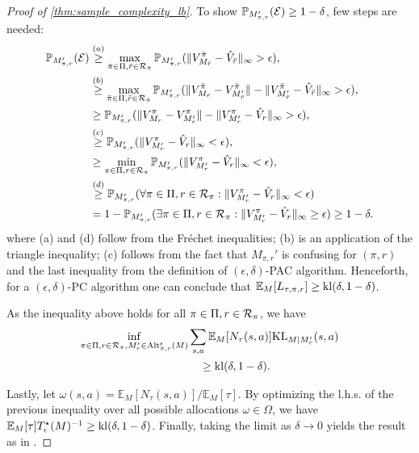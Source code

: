\begin{proof}[Proof of \cref{thm:sample_complexity_lb}]
 To show $\mathbb{P}_{M_{\pi,r}'}({\cal E})\geq 1-\delta$, few steps are needed:
 \begin{align*}
         \mathbb{P}_{M_{\pi,r}'}({\cal E}) & \stackrel{(a)}{\geq} \max_{\bar\pi\in \Pi,\bar r\in {\cal R}_{\bar\pi}} \mathbb{P}_{M_{\pi,r}'}(\|V_{M_{\bar r}}^{\bar\pi} - \hat V_{\bar r}\|_\infty > \epsilon),\\
         &\stackrel{(b)}{\geq} \max_{\bar\pi\in \Pi,\bar r\in {\cal R}_{\bar\pi}} \mathbb{P}_{M_{\pi,r}'}(\|V_{M_{\bar r}}^{\bar\pi} - V_{M_{\bar r}'}^{\bar\pi}\| -\|V_{M_{\bar r}'}^{\bar\pi}- \hat V_{\bar r}\|_\infty > \epsilon),\\
         &\geq 
         \mathbb{P}_{M_{\pi,r}'}(\|V_{M_{ r}}^\pi - V_{M_{ r}'}^\pi\| -\|V_{M_{ r}'}^\pi- \hat V_{ r}\|_\infty > \epsilon),\\
         &\stackrel{(c)}{\geq} \mathbb{P}_{M_{\pi,r}'}(\|V_{M_{ r}'}^\pi- \hat V_{ r}\|_\infty < \epsilon),\\
         &\geq \min_{\pi\in \Pi, r\in {\cal R}_\pi} \mathbb{P}_{M_{\pi,r}'}(\|V_{M_{ r}'}^\pi- \hat V_{ r}\|_\infty < \epsilon),\\
         &\stackrel{(d)}{\geq}  \mathbb{P}_{M_{\pi,r}'}(\forall \pi\in \Pi,r\in {\cal R}_\pi:\|V_{M_{ r}'}^\pi- \hat V_{ r}\|_\infty < \epsilon)\\&=1-  \mathbb{P}_{M_{\pi,r}'}(\exists \pi\in \Pi, r\in{\cal R}_\pi:\|V_{M_{ r}'}^\pi- \hat V_{ r}\|_\infty \geq  \epsilon)\geq 1-\delta.
     \end{align*}
 where (a) and (d) follow from the Fréchet inequalities; (b) is an application of  the triangle inequality; (c) follows from the fact that $M_{\pi,r}'$ is confusing for  $(\pi,r)$ and the last inequality from the definition of $(\epsilon,\delta)$-PAC algorithm.
 Henceforth,  for a  $(\epsilon,\delta)$-PC algorithm one can conclude that $\mathbb{E}_{M}[L_{\tau,\pi,r}] \geq  {\rm kl}(\delta,1-\delta)$.


As the inequality above holds for all $\pi\in \Pi, r\in {\cal R}_\pi$, we have
\begin{align*} \inf_{\pi\in \Pi, r\in {\cal R}_\pi,M_r'\in{\rm Alt}_{\pi,r}^\epsilon(M)}&\sum_{s,a}\mathbb{E}_{M}[N_\tau(s,a)]{\rm KL}_{M|M_r'}(s,a)\\
 &\quad\geq {\rm kl}(\delta,1-\delta).
\end{align*}

Lastly, let $\omega(s,a) = \mathbb{E}_M[N_\tau(s,a)]/\mathbb{E}_M[\tau]$.
By optimizing the l.h.s. of the previous inequality  over all possible allocations $\omega \in \Omega$, we have
$
    \mathbb{E}_M[\tau]T_\epsilon^\star(M)^{-1} \geq {\rm kl}(\delta,1-\delta)$.
Finally, taking the limit as $\delta\to 0$ yields the result as in \cite{al2021navigating}.
\end{proof}





